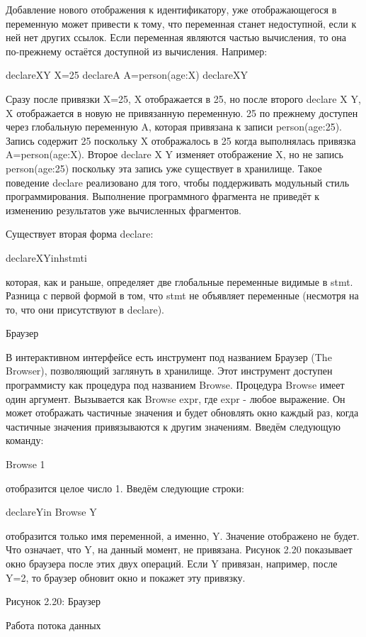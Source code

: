 Добавление нового отображения к идентификатору, уже отображающегося в переменную может привести к тому, что переменная станет недоступной, если к ней нет других ссылок. Если переменная являются частью вычисления, то она по-прежнему остаётся доступной из вычисления. Например:

declareXY
X=25
declareA
A=person(age:X)
declareXY

Сразу после привязки X=25, X отображается в 25, но после второго declare X Y, X отображается в новую не привязанную переменную. 25 по прежнему доступен через глобальную переменную A, которая привязана к записи person(age:25). Запись содержит 25 поскольку X отображалось в 25 когда выполнялась привязка A=person(age:X). Второе declare X Y изменяет отображение X, но не запись person(age:25) поскольку эта запись уже существует в хранилище. Такое поведение declare реализовано для того, чтобы поддерживать модульный стиль программирования. Выполнение программного фрагмента не приведёт к изменению результатов уже вычисленных фрагментов.

Существует вторая форма declare:

declareXYinhstmti

которая, как и раньше, определяет две глобальные переменные видимые в stmt. Разница с первой формой в том, что stmt не объявляет переменные (несмотря на то, что они присутствуют в declare).

Браузер

В интерактивном интерфейсе есть инструмент под названием Браузер (The Browser), позволяющий заглянуть в хранилище. Этот инструмент доступен программисту как процедура под названием Browse. Процедура Browse имеет один аргумент. Вызывается как {Browse expr}, где expr - любое выражение. Он может отображать частичные значения и будет обновлять окно каждый раз, когда частичные значения привязываются к другим значениям. Введём следующую команду:

{Browse 1}

отобразится целое число 1. Введём следующие строки:

declareYin
{Browse Y}

отобразится только имя переменной, а именно, Y. Значение отображено не будет. Что означает, что Y, на данный момент, не привязана. Рисунок 2.20 показывает окно браузера после этих двух операций. Если Y привязан, например, после Y=2, то браузер обновит окно и покажет эту привязку.

Рисунок 2.20: Браузер

Работа потока данных

